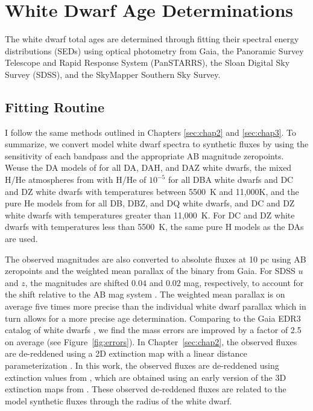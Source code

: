 \documentclass[twocolumn,linenumbers]{aastex631}
\begin{document}
\section{White Dwarf Age Determinations} \label{sec:age_determ_WDMS}
The white dwarf total ages are determined through fitting their spectral energy distributions (SEDs) using optical photometry from Gaia, the Panoramic Survey Telescope and Rapid Response System (PanSTARRS), the Sloan Digital Sky Survey (SDSS), and the SkyMapper Southern Sky Survey.

\subsection{Fitting Routine}\label{sec:fitting}
I follow the same methods outlined in Chapters \ref{sec:chap2} and \ref{sec:chap3}. To summarize, we convert model white dwarf spectra to synthetic fluxes by using the sensitivity of each bandpass and the appropriate AB magnitude zeropoints. Weuse the DA models of \cite{2010MmSAI..81..921K} for all DA, DAH, and DAZ white dwarfs, the mixed H/He atmospheres from \cite{2021MNRAS.501.5274C} with H/He of $10^{-5}$ for all DBA white dwarfs and DC and DZ white dwarfs with temperatures between 5500~K and 11,000K, and the pure He models from \cite{2021MNRAS.501.5274C} for all DB, DBZ, and DQ white dwarfs, and DC and DZ white dwarfs with temperatures greater than 11,000~K. For DC and DZ white dwarfs with temperatures less than 5500~K, the same pure H models as the DAs are used.

The observed magnitudes are also converted to absolute fluxes at 10 pc using AB zeropoints and the weighted mean parallax of the binary from Gaia. For SDSS $u$ and $z$, the magnitudes are shifted $0.04$ and $0.02$ mag, respectively, to account for the shift relative to the AB mag system \citep{2004AJ....128..502A}. The weighted mean parallax is on average five times more precise than the individual white dwarf parallax which in turn allows for a more precise age determination. Comparing to the Gaia EDR3 catalog of white dwarfs \citep{2021MNRAS.508.3877G}, we find the mass errors are improved by a factor of 2.5 on average (see Figure~\ref{fig:errors}). In Chapter~\ref{sec:chap2}, the observed fluxes are de-reddened using a 2D extinction map with a linear distance parameterization \citep{2011ApJ...737..103S}. In this work, the observed fluxes are de-reddened using extinction values from \cite{2021MNRAS.508.3877G}, which are obtained using an early version of the 3D extinction maps from \cite{vergley2022}. These observed de-reddened fluxes are related to the model synthetic fluxes through the radius of the white dwarf.
\end{document}
